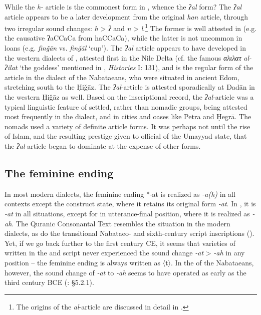 \documentclass[output=paper]{langsci/langscibook}
\begin{document}
While the \textit{h-} {article} is the commonest form in  , whence the \textit{ʔal} form? The \textit{ʔal} {article} appears to be a later development from the original \textit{han} {article}, through two irregular sound changes: \textit{h} > \textit{ʔ} and \textit{n} > \textit{l}.\footnote{The origins of the \textit{al}-{article} are discussed in detail in \citep{Al-Jalladforthcoming}.} The former is well attested in  (e.g. the {causative} ʔaCCaCa from haCCaCa), while the latter is not uncommon in loans (e.g. \textit{finǧān} vs. \textit{finǧāl} ‘cup’). The \textit{ʔal} {article} appears to have developed in the western dialects of  , attested first in the Nile Delta (cf. the famous \textit{αλιλατ} \textit{al-ʔilat} ‘the goddess’ mentioned in , \textit{Histories} I: 131), and is the regular form of the {article} in the dialect of the Nabataeans, who were situated in ancient Edom, stretching south to the Ḥiǧāz. The \textit{ʔal}-{article} is attested sporadically at Dadān in the western Ḥiǧāz as well. Based on the inscriptional record, the \textit{ʔal}-{article} was a typical linguistic feature of settled, rather than nomadic groups, being attested most frequently in the  dialect, and in cities and oases like Petra and Ḥegrā. The nomads used a variety of {definite} {article} forms. It was perhaps not until the rise of Islam, and the resulting {prestige} given to official  of the Umayyad state, that the \textit{ʔal} {article} began to dominate at the expense of other forms.

\subsection{The feminine ending}
In most modern  dialects, the feminine ending *-at is realized as \textit{-a(h)} in all contexts except the construct state, where it retains its original form \textit{-at}. In  , it is \textit{-at} in all situations, except for in utterance-final position, where it is realized as \textit{-ah}. The Quranic Consonantal Text resembles the situation in the modern dialects, as do the transitional Nabataeo- and sixth-century  script inscriptions (\citealt{Nehmé2017}). Yet, if we go back further to the first century CE, it seems that varieties of  written in the  and  script never experienced the sound change \textit{-at} > \textit{-ah} in any position – the feminine ending is always written as 〈t〉. In the  of the Nabataeans, however, the sound change of \textit{-at} to \textit{-ah} seems to have operated as early as the third century BCE (\citealt{Al-Jallad2017early}: §5.2.1). 
\end{document}
